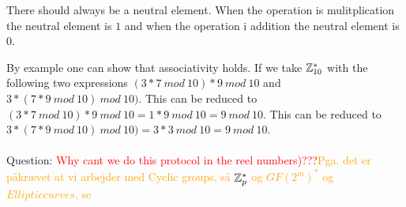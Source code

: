  There should always be a neutral element. When the operation is mulitplication the neutral element is $1$ and when the operation i addition the neutral element is $0$.

 By example one can show that associativity holds. If we take $ \mathbb{Z}_{10}^*$ with the following two expressions $ (3*7 \ mod \ 10)* 9 \ mod \ 10 $ and  $ 3 * ( 7*9 \ mod \ 10) \ mod \ 10) $. This can be reduced to $ (3*7 \ mod \ 10)* 9 \ mod \ 10 = 1 * 9 \ mod \ 10 = 9 \ mod \ 10$. This can be reduced to $ 3 * ( 7*9 \ mod \ 10) \ mod \ 10) = 3 * 3 \ mod \ 10 = 9 \ mod \ 10 $.  \\\\
Question: \textcolor{red}{Why cant we do this protocol in the reel numbers)???}\textcolor{orange}{Pga. det er påkrævet at vi arbejder med Cyclic groups, så $ \mathbb{Z}_p^* $ og $ GF(2^m)^* $ og $ Ellipticcurves $, se  }

